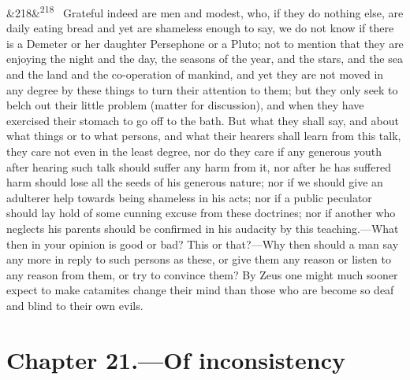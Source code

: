 \documentclass[12pt]{article}
\newcommand{\para}[1][]{\par\noindent\ifx&#1&\else\textsuperscript{\footnotesize #1}~\fi}
\begin{document}
\para[218] Grateful indeed are men and modest, who, if they do nothing else, are daily eating bread and yet are shameless enough to say, we do not know if there is a Demeter or her daughter Persephone or a Pluto; not to mention that they are enjoying the night and the day, the seasons of the year, and the stars, and the sea and the land and the co-operation of mankind, and yet they are not moved in any degree by these things to turn their attention to them; but they only seek to belch out their little problem (matter for discussion), and when they have exercised their stomach to go off to the bath. But what they shall say, and about what things or to what persons, and what their hearers shall learn from this talk, they care not even in the least degree, nor do they care if any generous youth after hearing such talk should suffer any harm from it, nor after he has suffered harm should lose all the seeds of his generous nature; nor if we should give an adulterer help towards being shameless in his acts; nor if a public peculator should lay hold of some cunning excuse from these doctrines; nor if another who neglects his parents should be confirmed in his audacity by this teaching.—What then in your opinion is good or bad? This or that?—Why then should a man say any more in reply to such persons as these, or give them any reason or listen to any reason from them, or try to convince them? By Zeus one might much sooner expect to make catamites change their mind than those who are become so deaf and blind to their own evils.

\section*{Chapter 21.---Of inconsistency}
\end{document}
